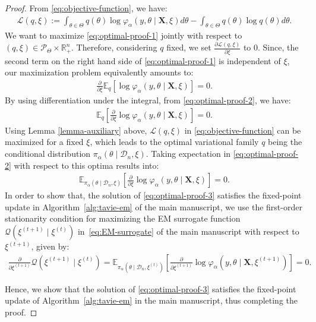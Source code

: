 \documentclass[12pt]{article}
\numberwithin{equation}{section}
\begin{document}
\begin{proof}
From \eqref{eq:objective-function}, we have:
\begin{align}\label{eq:optimal-proof-1}
    \mathcal{L}(q, \xi) := \int_{\theta\in \Theta}q(\theta)\log \varphi_{\alpha}(y, \theta\mid \mathbf{X}, \xi)d\theta - \int_{\theta\in \Theta}q(\theta)\log q(\theta)d\theta.
\end{align}
We want to maximize \eqref{eq:optimal-proof-1} jointly with respect to $(q, \xi) \in \mathcal{P}_{\Theta}\times \mathbb{R}_{+}^n$. Therefore, considering $q$ fixed, we set $\tfrac{\partial \mathcal{L}(q, \xi)}{\partial \xi}$ to $0$. Since, the second term on the right hand side of \eqref{eq:optimal-proof-1} is independent of $\xi$, our maximization problem equivalently amounts to:
\begin{align}\label{eq:optimal-proof-2}
    \frac{\partial}{\partial \xi}\mathbb{E}_{q}\left[\log \varphi_{\alpha}(y, \theta\mid \mathbf{X}, \xi)\right] = 0.
\end{align}
By using differentiation under the integral, from \eqref{eq:optimal-proof-2}, we have:
\begin{align}
    \mathbb{E}_{q}\left[\frac{\partial}{\partial\xi}\log \varphi_{\alpha}(y, \theta\mid \mathbf{X},\xi)\right] = 0.
\end{align}
Using Lemma \ref{lemma-auxiliary} above, $\mathcal{L}(q, \xi)$  in \eqref{eq:objective-function} can be maximized for a fixed $\xi$, which leads to the optimal variational family $q$ being the conditional distribution $\pi_{\alpha}(\theta\mid \mathcal{D}_n, \xi)$. Taking expectation in \eqref{eq:optimal-proof-2} with respect to this optima results into:
\begin{align}\label{eq:optimal-proof-3}
    \mathbb{E}_{\pi_{\alpha}(\theta\mid \mathcal{D}_n, \xi)}\left[\frac{\partial}{\partial\xi}\log \varphi_{\alpha}(y, \theta \mid \mathbf{X}, \xi)\right] = 0.
\end{align}
In order to show that, the solution of \eqref{eq:optimal-proof-3} satisfies the fixed-point update in Algorithm~\ref{alg:tavie-em} of the main manuscript, we use the first-order stationarity condition for maximizing the EM surrogate function $\mathcal{Q}(\xi^{(t+1)}\mid \xi^{(t)})$ in~\eqref{eq:EM-surrogate} of the main manuscript with respect to $\xi^{(t+1)}$, given by:
\begin{align}\label{eq:optimal-proof-4}
\frac{\partial}{\partial\xi^{(t+1)}}\mathcal{Q}(\xi^{(t+1)}\mid \xi^{(t)}) = \mathbb{E}_{\pi_{\alpha}(\theta\mid \mathcal{D}_n, \xi^{(t)})}\left[\frac{\partial}{\partial\xi^{(t+1)}}\log\varphi_{\alpha}(y, \theta\mid \mathbf{X},\xi^{(t+1)})\right] = 0.
\end{align}

Hence, we show that the solution of \eqref{eq:optimal-proof-3} satisfies the fixed-point update of Algorithm~\ref{alg:tavie-em} in the main manuscript, thus completing the proof.
\end{proof}
\end{document}
